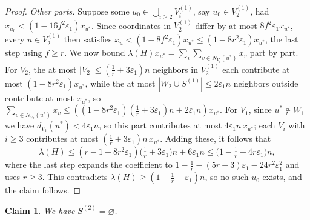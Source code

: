 \documentclass[11pt,a4paper]{article}
\newtheorem{claim}[theorem]{Claim}
\theoremstyle{definition}
\theoremstyle{plain}
\newcommand{\eps}{\varepsilon}
\renewcommand{\le}{\leqslant}
\renewcommand{\ge}{\geqslant}
\begin{document}
\begin{proof}
\emph{Other parts.} Suppose some
$u_0\in\bigcup_{i\ge2}V_i^{(1)}$, say $u_0\in V_2^{(1)}$,
had $x_{u_0}<(1-16f^2\eps_1)x_{u^\ast}$. Since coordinates
in $V_2^{(1)}$ differ by at most $8f^2\eps_1x_{u^\ast}$,
every $u\in V_2^{(1)}$ then satisfies
$x_u<(1-8f^2\eps_1)x_{u^\ast}\le(1-8r^2\eps_1)x_{u^\ast}$,
the last step using $f\ge r$. We now bound
$\lambda(H)x_{u^\ast}=\sum_i\sum_{v\in N_{V_i}(u^\ast)}x_v$
part by part. For $V_2$, the at most
$|V_2|\le(\tfrac1r+3\eps_1)n$ neighbors in $V_2^{(1)}$ each
contribute at most $(1-8r^2\eps_1)x_{u^\ast}$, while the at most
$|W_2\cup S^{(1)}|\le2\eps_1n$ neighbors outside contribute
at most $ x_{u^\ast}$, so
$\sum_{v\in N_{V_2}(u^\ast)}x_v
\le \left((1-8r^2\eps_1)(\tfrac1r+3\eps_1)n+2\eps_1n \right) x_{u^\ast}$. For $V_1$, since
$u^\ast\notin W_1$ we have $d_{V_1}(u^\ast)<4\eps_1n$, so
this part contributes at most $4\eps_1n\,x_{u^\ast}$; each
$V_i$ with $i\ge3$ contributes at most
$(\tfrac1r+3\eps_1)n\,x_{u^\ast}$. 
Adding these, it follows that 
\[
  \lambda(H)
  \le(r-1-8r^2\eps_1)\bigl(\tfrac1r+3\eps_1\bigr)n+6\eps_1n
  \le\bigl(1-\tfrac1r-4r\eps_1\bigr)n,
\]
where the last step expands the coefficient to
$1-\tfrac1r-(5r-3)\eps_1-24r^2\eps_1^2$ and uses $r\ge3$.
This contradicts $\lambda(H)\ge(1-\tfrac1r-\eps_1)n$, so no
such $u_0$ exists, and the claim follows.
\end{proof} 

\begin{claim}\label{clm:S-empty}
We have $S^{(2)}=\varnothing$.
\end{claim}
\end{document}

